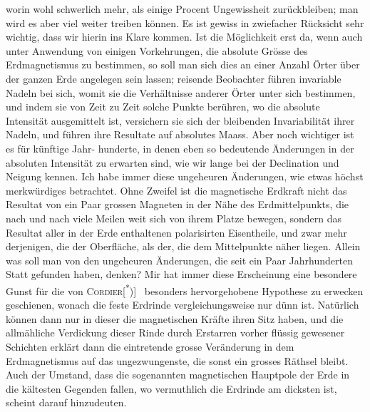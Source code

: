 worin wohl schwerlich mehr, als einige Procent Ungewissheit zurückbleiben;
man wird es aber viel weiter treiben können. Es ist gewiss in zwiefacher
Rücksicht sehr wichtig, dass wir hierin ins Klare kommen. Ist die Möglichkeit
erst da, wenn auch unter Anwendung von einigen Vorkehrungen, die
absolute Grösse des Erdmagnetismus zu bestimmen, so soll man sich dies an
einer Anzahl Örter über der ganzen Erde angelegen sein lassen; reisende
Beobachter führen invariable Nadeln bei sich, womit sie die Verhältnisse anderer
Örter unter sich bestimmen, und indem sie von Zeit zu Zeit solche Punkte
berühren, wo die absolute Intensität ausgemittelt ist, versichern sie sich der
bleibenden Invariabilität ihrer Nadeln, und führen ihre Resultate auf absolutes
Maass. Aber noch wichtiger ist es für künftige Jahr-
\clearpage{}
\noindent hunderte, in denen eben so bedeutende Änderungen in der absoluten Intensität
zu erwarten sind, wie wir lange bei der Declination und Neigung kennen.
Ich habe immer diese ungeheuren Änderungen, wie etwas höchst merkwürdiges
betrachtet. Ohne Zweifel ist die magnetische Erdkraft nicht das Resultat
von ein Paar grossen Magneten in der Nähe des Erdmittelpunkts,
die nach und nach viele Meilen weit sich von ihrem Platze bewegen, sondern
das Resultat aller in der Erde enthaltenen polarisirten Eisentheile, und zwar
mehr derjenigen, die der Oberfläche, als der, die dem Mittelpunkte näher liegen.
Allein was soll man von den ungeheuren Änderungen, die seit ein Paar Jahrhunderten
Statt gefunden haben, denken? Mir hat immer diese Erscheinung
eine besondere Gunst für die von \textsc{Cordier}[\textsuperscript{*})]\begingroup\renewcommand{\thefootnote}{}
\endgroup\ besonders hervorgehobene Hypothese
zu erwecken geschienen, wonach die feste Erdrinde vergleichungsweise nur
dünn ist. Natürlich können dann nur in dieser die magnetischen Kräfte ihren
Sitz haben, und die allmähliche Verdickung dieser Rinde durch Erstarren vorher
flüssig gewesener Schichten erklärt dann die eintretende grosse Veränderung
in dem Erdmagnetismus auf das ungezwungenste, die sonst ein grosses Räthsel
bleibt. Auch der Umstand, dass die sogenannten magnetischen Hauptpole
der Erde in die kältesten Gegenden fallen, wo vermuthlich die Erdrinde am
dicksten ist, scheint darauf hinzudeuten.

